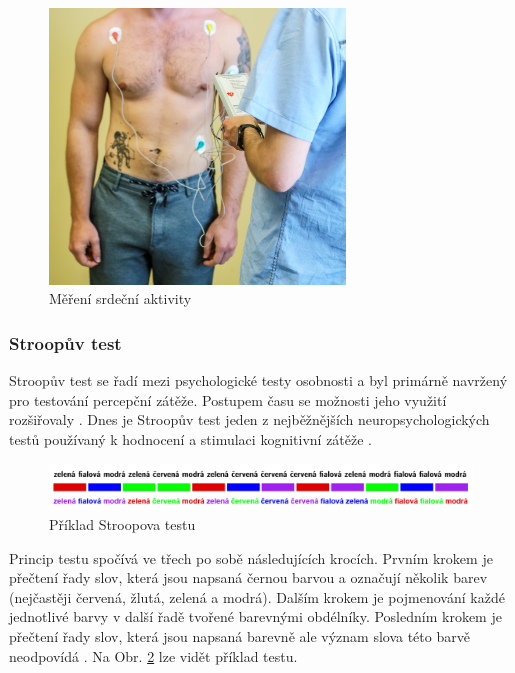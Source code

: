 \begin{figure}[h]
    \begin{center}
        \includegraphics[width=0.7\textwidth]{../assets/device/holter2}
        \caption{Měření srdeční aktivity}
        \label{fig:device_usage}
    \end{center}
\end{figure}

\subsubsection{Stroopův test}
\label{section:stroop_test}
Stroopův test se řadí mezi psychologické testy osobnosti a byl primárně navržený
pro testování percepční zátěže. Postupem času se možnosti jeho využití
rozšiřovaly \cite{Svoboda1999}. Dnes je Stroopův test jeden z nejběžnějších
neuropsychologických testů používaný k hodnocení  a stimulaci kognitivní zátěže
\cite{Scarpina2017}.

\begin{figure}[h]
    \begin{center}
        \includegraphics[width=1\textwidth]{../assets/figures/stroop}
        \caption{Příklad Stroopova testu \cite{stroopWiki}}
        \label{fig:stroop}
    \end{center}
\end{figure}

Princip testu spočívá ve třech po sobě následujících krocích. Prvním krokem je
přečtení řady slov, která jsou napsaná černou barvou a označují několik barev
(nejčastěji červená, žlutá, zelená a modrá). Dalším krokem je pojmenování každé
jednotlivé barvy v další řadě tvořené barevnými obdélníky. Posledním krokem je
přečtení řady slov, která jsou napsaná barevně ale význam slova této barvě
neodpovídá \cite{Svoboda1999}. Na Obr. \ref{fig:stroop} lze vidět příklad testu.

